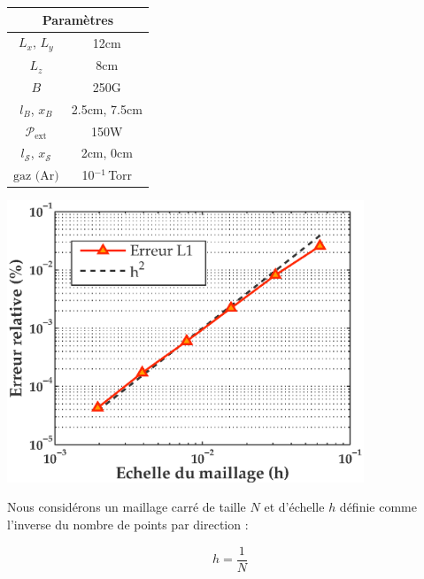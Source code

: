 \begin{refsection}
\bigskip
\begin{minipage}{\textwidth}
\begin{minipage}[b]{0.32\textwidth}
\footnotesize
\centering
{}
\begin{tabular}{cc}\toprule
\multicolumn{2}{c}{\bf Paramètres}\\
\midrule 
$L_x$, $L_y$ & 12cm\\
$L_z$ & 8cm\\
$B$&250G\\
$l_B$, $x_B$&2.5cm, 7.5cm\\
$\mathcal{P}_\text{ext}$&150W\\
$l_{\mathcal S}$, $x_{\mathcal S}$&2cm, 0cm\\
$\text{gaz (Ar)}$ & 10$^{-1}\,$Torr\\
\bottomrule
\end{tabular}\bigskip\medskip
\label{3-paramConvStudy}
      \end{minipage}
  \hfill
      \begin{minipage}[b]{0.62\textwidth}\centering
    \includegraphics[width=0.8\textwidth]{figures/3-convergence.eps}
    \label{3-convergence}
    \end{minipage}
\end{minipage}
\bigskip

Nous considérons un maillage carré de taille $N$ et d'échelle $h$
définie comme l'inverse du nombre de points par direction :

\begin{equation}
h=\frac{1}{N}
\end{equation}


\end{refsection}
